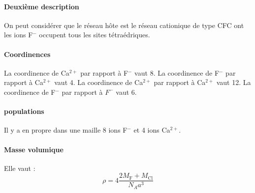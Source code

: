 \documentclass[french]{book}
\theoremstyle{plain}
\theoremstyle{definition}
\theoremstyle{remark}
\begin{document}
\paragraph{Deuxième description} On peut considérer que le réseau hôte est le réseau cationique de type CFC ont les ions F$^-$ occupent tous les sites tétraédriques.
\paragraph{Coordinences} La coordinence de Ca$^{2+}$ par rapport à F$^-$ vaut $8$. La coordinence de F$^-$ par rapport à Ca$^{2+}$ vaut 4. La coordinence de Ca$^{2+}$ par rapport à Ca$^{2+}$ vaut 12. La coordinence de F$^-$ par rapport à $F^-$ vaut 6.
\paragraph{populations} Il y a en propre dans une maille 8 ions F$^-$ et 4 ions Ca$^{2+}$.
\paragraph{Masse volumique} Elle vaut : $$\rho=4\frac{2M_{\text{F}}+M_\text{Cl}}{N_Aa^3}$$
\end{document}
